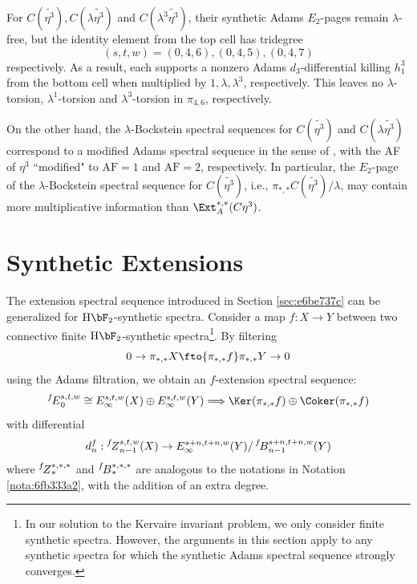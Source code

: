 \documentclass{amsart}
\numberwithin{equation}{section}
\newcommand{\AF}{\mathrm{AF}}
\newcommand{\ESS}[1]{\prescript{#1\!}{}{E}}
\newcommand{\ZESS}[1]{\prescript{#1\!}{}{Z}}
\newcommand{\BESS}[1]{\prescript{#1\!}{}{B}}
\newcommand{\HF}{\mathrm{H}\bF_2}
\begin{document}
\begin{remark}
    For $C(\tilde{\eta^3}), C(\lambda\tilde{\eta^3})$ and $C(\lambda^3\tilde{\eta^3})$, their synthetic Adams $E_2$-pages remain $\lambda$-free, but the identity element from the top cell has tridegree 
    $$(s,t,w) =(0,4,6), (0,4,5), (0,4,7)$$ 
    respectively. As a result, each supports a nonzero Adams $d_3$-differential killing $h_1^3$ from the bottom cell when multiplied by $1, \lambda, \lambda^3$, respectively. This leaves no $\lambda$-torsion, $\lambda^1$-torsion and $\lambda^3$-torsion in $\pi_{4,6}$, respectively.

    On the other hand, the $\lambda$-Bockstein spectral sequences for $C(\tilde{\eta^3})$ and $ C(\lambda\tilde{\eta^3})$ correspond to a modified Adams spectral sequence in the sense of \cite[Section 3]{BHHM}, with the AF of $\eta^3$ ``modified" to $\AF=1$ and $\AF=2$, respectively. In particular, the $E_2$-page of the $\lambda$-Bockstein spectral sequence for $C(\tilde{\eta^3})$, i.e., $\pi_{*,*}C(\tilde{\eta^3})/\lambda$, may contain more multiplicative information than $\Ext_A^{*,*}(C\eta^3)$. 
    
    
    
    
   
\end{remark}

\section{Synthetic Extensions} \label{sec:synext}
The extension spectral sequence introduced in Section \ref{sec:e6be737c} can be generalized for $\HF$-synthetic spectra. Consider a map $f: X\to Y$ between two connective finite $\HF$-synthetic spectra\footnote{In our solution to the Kervaire invariant problem, we only consider finite synthetic spectra. However, the arguments in this section apply to any synthetic spectra for which the synthetic Adams spectral sequence strongly converges.}. By filtering
$$0\to \pi_{*,*}X\fto{\pi_{*,*}f} \pi_{*,*}Y\to 0$$
using the Adams filtration, we obtain an $f$-extension spectral sequence:
$$\ESS{f}_0^{s,t,w} \cong E_\infty^{s,t,w}(X) \oplus E_\infty^{s,t,w}(Y) \Longrightarrow \Ker(\pi_{*,*}f)\oplus \Coker(\pi_{*,*}f)$$
with differential
$$d_n^f: \ZESS{f}_{n-1}^{s,t,w}(X)\to E_\infty^{s+n,t+n,w}(Y)/\BESS{f}_{n-1}^{s+n,t+n,w}(Y)$$
where $\ZESS{f}_*^{*,*,*}$ and $\BESS{f}_*^{*,*,*}$ are  analogous to the notations in Notation \ref{nota:6fb333a2}, with the addition of an extra degree.
\end{document}
